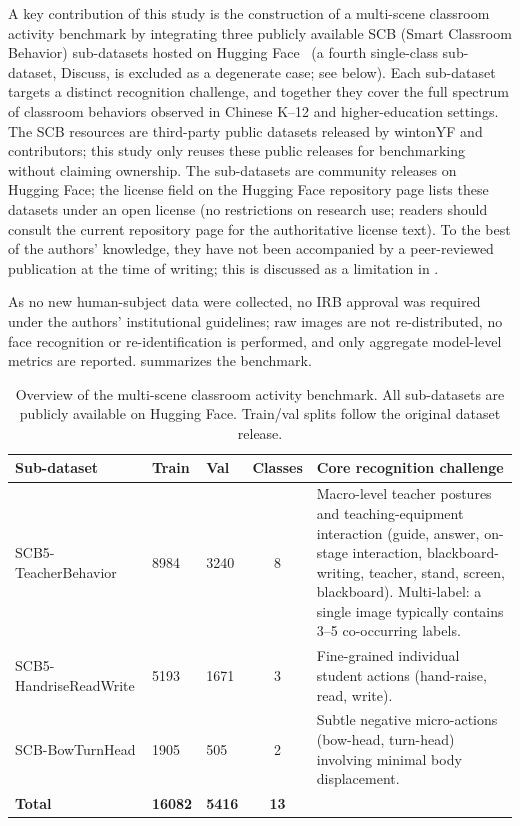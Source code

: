 \documentclass[symmetry,article,submit,pdftex,moreauthors]{Definitions/mdpi}
\begin{document}
A key contribution of this study is the construction of a multi-scene classroom activity benchmark by integrating three publicly available SCB (Smart Classroom Behavior) sub-datasets hosted on Hugging Face~\cite{scb_dataset} (a fourth single-class sub-dataset, Discuss, is excluded as a degenerate case; see below).
Each sub-dataset targets a distinct recognition challenge, and together they cover the full spectrum of classroom behaviors observed in Chinese K--12 and higher-education settings.
The SCB resources are third-party public datasets released by wintonYF and contributors; this study only reuses these public releases for benchmarking without claiming ownership. The sub-datasets are community releases on Hugging Face; the license field on the Hugging Face repository page lists these datasets under an open license (no restrictions on research use; readers should consult the current repository page for the authoritative license text). To the best of the authors' knowledge, they have not been accompanied by a peer-reviewed publication at the time of writing; this is discussed as a limitation in .

As no new human-subject data were collected, no IRB approval was required under the authors' institutional guidelines; raw images are not re-distributed, no face recognition or re-identification is performed, and only aggregate model-level metrics are reported.
 summarizes the benchmark.

\begin{table}[H]
\caption{Overview of the multi-scene classroom activity benchmark. All sub-datasets are publicly available on Hugging Face. Train/val splits follow the original dataset release.}
\label{tab:benchmark_overview}
\centering
\small
\begin{tabular}{p{2.8cm}p{1.1cm}p{1.1cm}cp{5.0cm}}
\toprule
\textbf{Sub-dataset} & \textbf{Train} & \textbf{Val} & \textbf{Classes} & \textbf{Core recognition challenge} \\
\midrule
SCB5-TeacherBehavior & 8984 & 3240 & 8 & Macro-level teacher postures and teaching-equipment interaction (guide, answer, on-stage interaction, blackboard-writing, teacher, stand, screen, blackboard). Multi-label: a single image typically contains 3--5 co-occurring labels. \\
\addlinespace
SCB5-HandriseReadWrite & 5193 & 1671 & 3 & Fine-grained individual student actions (hand-raise, read, write). \\
\addlinespace
SCB-BowTurnHead & 1905 & 505 & 2 & Subtle negative micro-actions (bow-head, turn-head) involving minimal body displacement. \\
\midrule
\textbf{Total} & \textbf{16082} & \textbf{5416} & \textbf{13} & \\
\bottomrule
\end{tabular}
\end{table}
\end{document}
